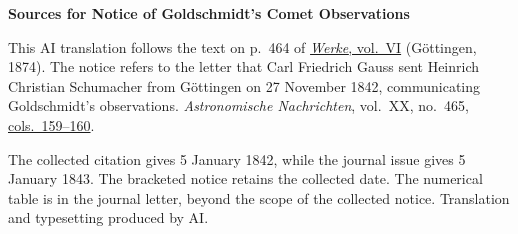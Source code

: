 \clearpage\thispagestyle{empty}
\begin{center}\textbf{Sources for Notice of Goldschmidt’s Comet Observations}\end{center}
\noindent This AI translation follows the text on p.~464 of \href{https://gdz.sub.uni-goettingen.de/id/PPN236007467}{\textit{Werke}, vol.~VI} (Göttingen, 1874). The notice refers to the letter that Carl Friedrich Gauss sent Heinrich Christian Schumacher from Göttingen on 27 November 1842, communicating Goldschmidt’s observations. \textit{Astronomische Nachrichten}, vol.~XX, no.~465, \href{https://api.digitale-sammlungen.de/iiif/image/v2/bsb10049445_00088/full/1800,/0/default.jpg}{cols.~159--160}.
\par\smallskip\noindent The collected citation gives 5 January 1842, while the journal issue gives 5 January 1843. The bracketed notice retains the collected date. The numerical table is in the journal letter, beyond the scope of the collected notice. Translation and typesetting produced by AI.
\clearpage

